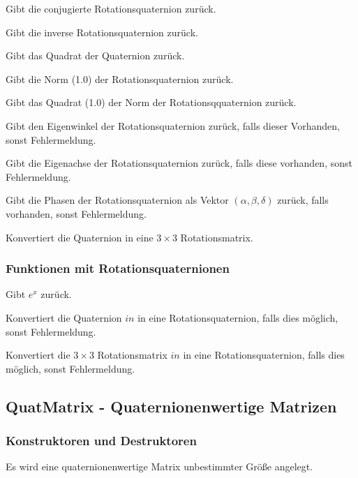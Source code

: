 \descr
{
Gibt die conjugierte Rotationsquaternion zurück.
}

\descr
{
Gibt die inverse Rotationsquaternion zurück.
}

\descr
{
Gibt das Quadrat der Quaternion zurück.
}

\descr
{
Gibt die Norm (1.0) der Rotationsquaternion zurück.
}

\descr
{
Gibt das Quadrat (1.0) der Norm der Rotationsqquaternion zurück.
}

\descr
{
Gibt den Eigenwinkel der Rotationsquaternion zurück, falls dieser Vorhanden, sonst
Fehlermeldung.
}

\descr
{
Gibt die Eigenachse der Rotationsquaternion zurück, falls diese vorhanden, sonst
Fehlermeldung.
}

\descr
{
Gibt die Phasen der Rotationsquaternion als Vektor $(\alpha,\beta,\delta)$ zurück,
falls vorhanden, sonst Fehlermeldung.
}

\descr
{
Konvertiert die Quaternion in eine $3\times 3$ Rotationsmatrix.
}


\subsubsection{Funktionen mit Rotationsquaternionen}
\descr
{
Gibt $e^x$ zurück.
}

\descr
{
Konvertiert die Quaternion $in$ in eine Rotationsquaternion, falls dies
möglich, sonst Fehlermeldung.
}

\descr
{
Konvertiert die $3\times 3$ Rotationsmatrix $in$ in eine Rotationsquaternion,
falls dies möglich, sonst Fehlermeldung.
}
\subsection{QuatMatrix - Quaternionenwertige Matrizen}
\hypertarget{QuatMatrix}{}
\subsubsection{Konstruktoren und Destruktoren}
\descr
{
Es wird eine quaternionenwertige Matrix unbestimmter Größe angelegt.
}

